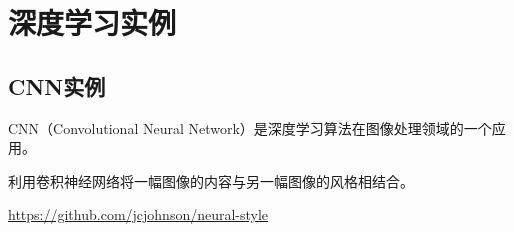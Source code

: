 \chapter{深度学习实例}
\section{CNN实例}
CNN（Convolutional Neural Network）是深度学习算法在图像处理领域的一个应用。

利用卷积神经网络将一幅图像的内容与另一幅图像的风格相结合。

\url{https://github.com/jcjohnson/neural-style}

